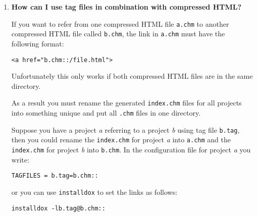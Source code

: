\begin{enumerate}
\footnotesize\begin{verbatim}
/*! \class MyClassName include.h path/include.h
 *
 *  Docs for MyClassName
 */
\end{verbatim}
\normalsize


To make doxygen put \par
\par
 {\tt  \#include $<$path/include.h$>$ }

in the documentation of the class MyClassName regardless of the name of the actual header file in which the definition of MyClassName is contained.

If you want doxygen to show that the include file should be included using quotes instead of angle brackets you should type: 

\footnotesize\begin{verbatim}
/*! \class MyClassName myhdr.h "path/myhdr.h"
 *
 *  Docs for MyClassName
 */
\end{verbatim}
\normalsize


\item {\bf How can I use tag files in combination with compressed HTML?}

If you want to refer from one compressed HTML file {\tt a.chm} to another compressed HTML file called {\tt b.chm}, the link in {\tt a.chm} must have the following format: 

\footnotesize\begin{verbatim}
<a href="b.chm::/file.html">
\end{verbatim}
\normalsize
 Unfortunately this only works if both compressed HTML files are in the same directory.

As a result you must rename the generated {\tt index.chm} files for all projects into something unique and put all {\tt .chm} files in one directory.

Suppose you have a project {\em a\/} referring to a project {\em b\/} using tag file {\tt b.tag}, then you could rename the {\tt index.chm} for project {\em a\/} into {\tt a.chm} and the {\tt index.chm} for project {\em b\/} into {\tt b.chm}. In the configuration file for project {\em a\/} you write: 

\footnotesize\begin{verbatim}
TAGFILES = b.tag=b.chm::
\end{verbatim}
\normalsize
 or you can use {\tt installdox} to set the links as follows: 

\footnotesize\begin{verbatim}
installdox -lb.tag@b.chm::
\end{verbatim}
\normalsize



\end{enumerate}
